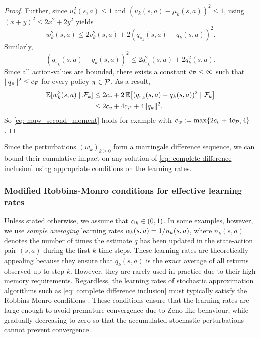 \begin{proof}
    Further, since $u_k^2(s,a) \le 1$ and $(u_k(s,a) - \mu_k(s,a))^2 \le 1$,
    using $(x+y)^2 \le 2 x^2 + 2 y^2$ yields
    \[
    w_k^2(s,a) \le 2 v_k^2(s,a) + 2 (q_{\pi_k}(s,a)-q_k(s,a) )^2 .
    \]
    Similarly,
    \[
    ( q _{\pi_k}(s,a)-q_k(s,a) )^2
    \le
    2 q_{\pi_k}^2(s,a) + 2 q_k^2(s,a) .
    \]
    Since all action-values are bounded,
    there exists a constant $c_{\mathcal{P}} < \infty$ such that $\|q_\pi\|^2 \leq c_{\mathcal{P}}$ for every policy $\pi \in \mathcal{P}$. As a result,
    \begin{align*}
    \mathbb E [ w_{k}^2(s,a) \mid \mathcal F_k ]
    &\le
    2 c_v + 2 \, \mathbb E \!\left[ ( q_{\pi_k}(s,a)-q_k(s,a) )^2 \mid \mathcal F_k \right]
    \\
    &\le
    2 c_v + 4 c_{\mathcal{P}} + 4 \|q_k\|^2 .
    \end{align*}
    So \eqref{eq: muw_second_moment} holds for example with $c_w := \max \{ 2 c_v + 4 c_{\mathcal{P}}, 4\}$.
\end{proof}

Since the perturbations $(w_k)_{k \ge 0}$ form a martingale difference sequence,
we can bound their cumulative impact on any solution of \eqref{eq: complete difference inclusion} using appropriate conditions on the learning rates.


\subsubsection{Modified Robbins-Monro conditions for effective learning rates}
\label{sec: modified robbins monro conditions}


Unless stated otherwise, we assume that $\alpha_k \in (0,1)$. In some examples, however, we use \textit{sample averaging} learning rates $\alpha_k(s,a) = 1/n_k(s,a)$, where $n_k(s, a)$ denotes the number of times the estimate $q$ has been updated in the state-action pair $(s, a)$ during the first $k$ time steps. 
These learning rates are theoretically appealing because they ensure that $q_k(s,a)$ is the exact average of all returns observed up to step $k$.
However, they are rarely used in practice due to their high memory requirements.
Regardless, the learning rates of stochastic approximation algorithms such as \eqref{eq: complete difference inclusion} must typically satisfy the Robbins-Monro conditions \citep{Robbins1951AMethod}.
These conditions ensure that the learning rates are large enough to avoid premature convergence due to Zeno-like behaviour,
while gradually decreasing to zero so that the accumulated stochastic perturbations
cannot prevent convergence.

